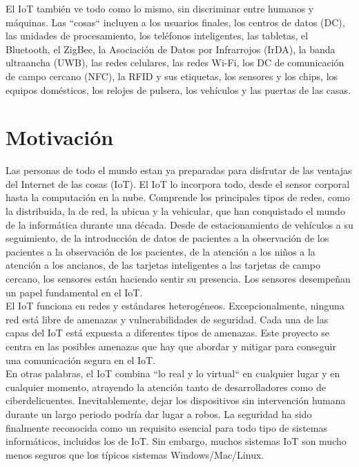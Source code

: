 {El IoT también ve todo como lo mismo, sin discriminar entre humanos y máquinas. Las ``cosas`` incluyen a los usuarios finales, los centros de datos (DC), las unidades de procesamiento, los teléfonos inteligentes, las tabletas, el Bluetooth, el ZigBee, la Asociación de Datos por Infrarrojos (IrDA), la banda ultraancha (UWB), las redes celulares, las redes Wi-Fi, los DC de comunicación de campo cercano (NFC), la RFID y sus etiquetas, los sensores y los chips, los equipos domésticos, los relojes de pulsera, los vehículos y las puertas de las casas. \cite{lea2020iot} \\

\section{Motivación}

Las personas de todo el mundo estan ya preparadas para disfrutar de las ventajas del Internet de las cosas (IoT). El IoT lo incorpora todo, desde el sensor corporal hasta la computación en la nube. Comprende los principales tipos de redes, como la distribuida, la de red, la ubicua y la vehicular, que han conquistado el mundo de la informática durante una década. Desde de estacionamiento de vehículos a su seguimiento, de la introducción de datos de pacientes a la observación de los pacientes a la observación de los pacientes, de la atención a los niños a la atención a los ancianos, de las tarjetas inteligentes a las tarjetas de campo cercano, los sensores están haciendo sentir su presencia. Los sensores desempeñan un papel fundamental en el IoT.\\

El IoT funciona en redes y estándares heterogéneos. Excepcionalmente, ninguna red está libre de amenazas y vulnerabilidades de seguridad. Cada una de las capas del IoT está expuesta a diferentes tipos de amenazas. Este proyecto se centra en las posibles amenazas que hay que abordar y mitigar para conseguir una comunicación segura en el IoT. \cite{hanes2017iot} \\

En otras palabras, el IoT combina ``lo real y lo virtual`` en cualquier lugar y en cualquier momento, atrayendo la atención tanto de desarrolladores como de ciberdelicuentes. Inevitablemente, dejar los dispositivos sin intervención humana durante un largo periodo podría dar lugar a robos. La seguridad ha sido finalmente reconocida como un requisito esencial para todo tipo de sistemas informáticos, incluidos los de IoT. Sin embargo, muchos sistemas IoT son mucho menos seguros que los típicos sistemas Windows/Mac/Linux. \\

}
